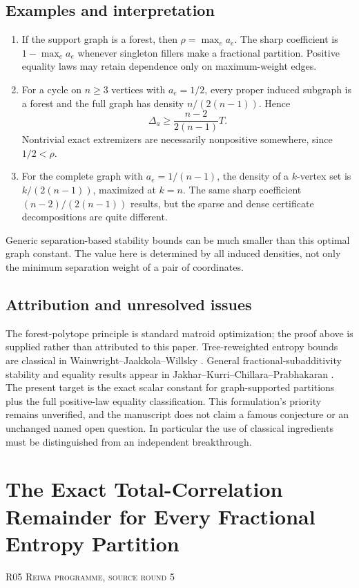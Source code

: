 \documentclass[11pt,a4paper]{article}
\theoremstyle{definition}\newtheorem{definition}[theorem]{Definition}
\theoremstyle{remark}\newtheorem{remark}[theorem]{Remark}
\numberwithin{equation}{section}
\begin{document}
\subsection{Examples and interpretation}\label{R04-sec-5}
\begin{enumerate}
\item If the support graph is a forest, then $\rho=\max_ea_e$. The sharp coefficient is $1-\max_ea_e$ whenever singleton fillers make a fractional partition. Positive equality laws may retain dependence only on maximum-weight edges.
\item For a cycle on $n\geq3$ vertices with $a_e=1/2$, every proper induced subgraph is a forest and the full graph has density $n/(2(n-1))$. Hence
\[
\Delta_a\geq\frac{n-2}{2(n-1)}T.
\]
Nontrivial exact extremizers are necessarily nonpositive somewhere, since $1/2<\rho$.
\item For the complete graph with $a_e=1/(n-1)$, the density of a $k$-vertex set is $k/(2(n-1))$, maximized at $k=n$. The same sharp coefficient $(n-2)/(2(n-1))$ results, but the sparse and dense certificate decompositions are quite different.
\end{enumerate}
Generic separation-based stability bounds can be much smaller than this optimal graph constant. The value here is determined by all induced densities, not only the minimum separation weight of a pair of coordinates.

\subsection{Attribution and unresolved issues}\label{R04-sec-6}
The forest-polytope principle is standard matroid optimization; the proof above is supplied rather than attributed to this paper. Tree-reweighted entropy bounds are classical in Wainwright--Jaakkola--Willsky \cite{ref065}. General fractional-subadditivity stability and equality results appear in Jakhar--Kurri--Chillara--Prabhakaran \cite{ref066}. The present target is the exact scalar constant for graph-supported partitions plus the full positive-law equality classification. This formulation's priority remains unverified, and the manuscript does not claim a famous conjecture or an unchanged named open question. In particular the use of classical ingredients must be distinguished from an independent breakthrough.




\clearpage
\section[R05 --- The Exact Total-Correlation Remainder for Every Fractional Entropy Partition]{The Exact Total-Correlation Remainder for Every Fractional Entropy Partition}\label{contrib-R05}
\noindent\textsc{R05 \quad Reiwa programme, source round 5}\par\medskip
\end{document}
